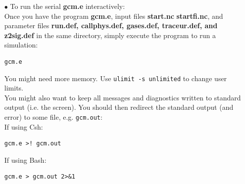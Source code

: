 \begin{itemize}
\item[$\bullet$] To run the serial {\bf gcm.e} interactively:\\
Once you have the program {\bf gcm.e},
input files {\bf start.nc} {\bf startfi.nc},
and parameter files {\bf run.def, callphys.def, gases.def, traceur.def, and z2sig.def}
in the same directory, simply execute the program to run a simulation:
\begin{verbatim}
gcm.e
\end{verbatim}

You might need more memory. Use \verb|ulimit -s unlimited| to change user limits.\\
You might also want to keep all messages and diagnostics written to standard
output (i.e. the screen). You should then redirect the standard output
(and error) to some file, e.g. {\tt gcm.out}:\\
If using Csh:
\begin{verbatim}
gcm.e >! gcm.out
\end{verbatim}
If using Bash:
\begin{verbatim}
gcm.e > gcm.out 2>&1
\end{verbatim}



\end{itemize}
